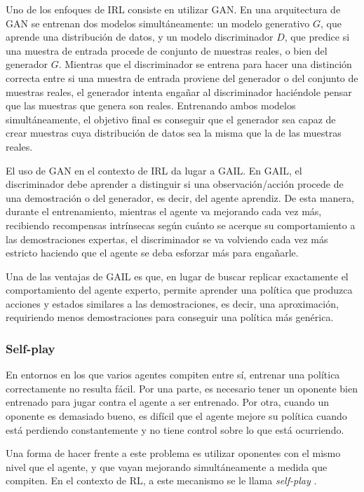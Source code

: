 Uno de los enfoques de IRL consiste en utilizar GAN. En una arquitectura de GAN se entrenan dos modelos simultáneamente: un modelo generativo $G$, que aprende una distribución de datos, y un modelo discriminador $D$, que predice si una muestra de entrada procede de conjunto de muestras reales, o bien del generador $G$. Mientras que el discriminador se entrena para hacer una distinción correcta entre si una muestra de entrada proviene del generador o del conjunto de muestras reales, el generador intenta engañar al discriminador haciéndole pensar que las muestras que genera son reales. Entrenando ambos modelos simultáneamente, el objetivo final es conseguir que el generador sea capaz de crear muestras cuya distribución de datos sea la misma que la de las muestras reales.

\newpage

El uso de GAN en el contexto de IRL da lugar a GAIL. En GAIL, el discriminador debe aprender a distinguir si una observación/acción procede de una demostración o del generador, es decir, del agente aprendiz. De esta manera, durante el entrenamiento, mientras el agente va mejorando cada vez más, recibiendo recompensas intrínsecas según cuánto se acerque su comportamiento a las demostraciones expertas, el discriminador se va volviendo cada vez más estricto haciendo que el agente se deba esforzar más para engañarle.

Una de las ventajas de GAIL es que, en lugar de buscar replicar exactamente el comportamiento del agente experto, permite aprender una política que produzca acciones y estados similares a las demostraciones, es decir, una aproximación, requiriendo menos demostraciones para conseguir una política más genérica.

\subsubsection{Self-play}

En entornos en los que varios agentes compiten entre sí, entrenar una política correctamente no resulta fácil. Por una parte, es necesario tener un oponente bien entrenado para jugar contra el agente a ser entrenado. Por otra, cuando un oponente es demasiado bueno, es difícil que el agente mejore su política cuando está perdiendo constantemente y no tiene control sobre lo que está ocurriendo.

Una forma de hacer frente a este problema es utilizar oponentes con el mismo nivel que el agente, y que vayan mejorando simultáneamente a medida que compiten. En el contexto de RL, a este mecanismo se le llama \emph{self-play} \cite{self-play}.

